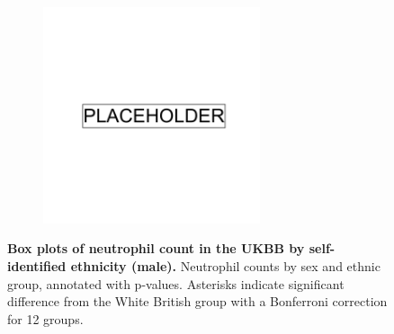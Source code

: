 \begin{figure}
    \centering
    \begin{subfigure}{\textwidth}
    \includegraphics[width=0.7\textwidth]{placeholder.png}
    \end{subfigure}
    \caption[Box plots of neutrophil count in the UKBB by self-identified ethnicity (male)]{\textbf{Box plots of neutrophil count in the UKBB by self-identified ethnicity (male).} Neutrophil counts by sex and ethnic group, annotated with p-values. Asterisks indicate significant difference from the White British group with a Bonferroni correction for 12 groups.}
    \label{fig:supp_box_neutrophill_m}
\end{figure}

\newpage

